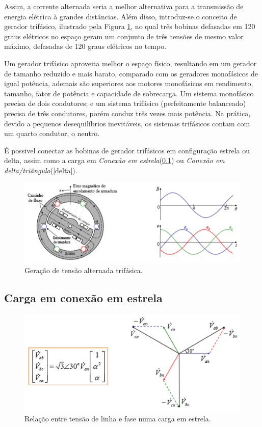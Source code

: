 \documentclass[a4paper,12pt,oneside,openany,table,xcdraw]{article}
\begin{document}
Assim, a corrente alternada seria a melhor alternativa para a transmissão de energia elétrica à grandes distâncias. Além disso, introduz-se o conceito de gerador trifásico, ilustrado pela Figura \ref{gerador}, no qual três bobinas defasadas em 120 graus elétricos no espaço geram um conjunto de três tensões de mesmo valor máximo, defasadas de 120 graus elétricos no tempo.

Um gerador trifásico aproveita melhor o espaço físico, resultando em um gerador de tamanho reduzido e mais barato, comparado com os geradores monofásicos de igual potência, ademais são superiores aos motores monofásicos em rendimento, tamanho, fator de potência e capacidade de sobrecarga.
Um sistema monofásico precisa de dois condutores; e um sistema trifásico (perfeitamente balanceado) precisa de três condutores, porém conduz três vezes mais potência. Na prática, devido a pequenos desequilíbrios inevitáveis, os sistemas trifásicos contam com um quarto condutor, o neutro.

É possivel conectar as bobinas de gerador trifásicos em configuração estrela ou delta, assim como a carga em \emph{Conexão em estrela}(\ref{estrela}) ou  \emph{Conexão em delta/triângulo}(\ref{delta}).
\begin{figure}[H]
\centering
\captionsetup{font=scriptsize}
\includegraphics[width=14.5cm]{motor3phi}
\caption{Geração de tensão alternada trifásica.}
\label{gerador}
\end{figure}

\subsection{Carga em conexão em estrela} \label{estrela}
\begin{figure}[H]
\centering
\captionsetup{font=scriptsize}
\includegraphics[width=14.5cm]{carga-estrela}
\caption{Relação entre tensão de linha e fase numa carga em estrela.}
\label{carga-estrela}
\end{figure}
\end{document}
